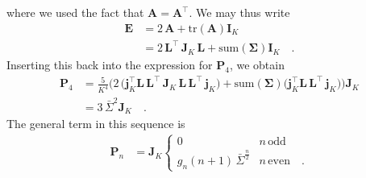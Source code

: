\documentclass[modern]{aastex62}
\begin{document}
    where we used the fact that $\mathbf{A} = \mathbf{A}^\top$. We may thus write
    \begin{align}
        \mathbf{E} & =
        2 \, \mathbf{A} + \mathrm{tr}(\mathbf{A}) \mathbf{I}_K
        \nonumber      \\
                   & =
        2 \, \mathbf{L}^\top \, \mathbf{J}_K \, \mathbf{L} + \mathrm{sum}(\pmb{\Sigma}) \mathbf{I}_K
        \quad.
    \end{align}
    Inserting this back into the expression for $\mathbf{P}_4$, we obtain
    \begin{align}
        \mathbf{P}_4 & =
        \frac{5}{K^4}
        \bigg(
        2 \, \big(\mathbf{j}_K^\top \mathbf{L} \, \mathbf{L}^\top \, \mathbf{J}_K \, \mathbf{L} \, \mathbf{L}^\top \, \mathbf{j}_K \big)
        +
        \mathrm{sum}(\pmb{\Sigma}) \big(\mathbf{j}_K^\top \mathbf{L} \, \mathbf{L}^\top \, \mathbf{j}_K \big)
        \bigg) \mathbf{J}_K
        \nonumber        \\
                     & =
        3 \, \bar{\Sigma}^2 \mathbf{J}_K
        \quad.
    \end{align}
    The general term in this sequence is
    \begin{align}
        \mathbf{P}_n & =
        \mathbf{J}_K
        \begin{cases}
            0                                       & n \, \mathrm{odd}
            \\
            g_n (n + 1) \, \bar{\Sigma}^\frac{n}{2} & n \, \mathrm{even}
            \quad.
        \end{cases}
    \end{align}
\end{document}

